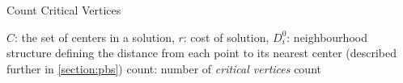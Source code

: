 \begin{algorithm}[H] 
\caption{Count Critical Vertices}
\label{alg:count_cv}
\begin{algorithmic}[1]
\Require $C$: the set of centers in a solution, $r$: cost of solution, $D_i^0$: neighbourhood structure defining the distance from each point to its nearest center (described further in \cref{section:pbs})
\Ensure count: number of \emph{critical vertices}
        \EndIf
    \EndFor
    \State \Return count
\EndFunction
\end{algorithmic}
\end{algorithm}
